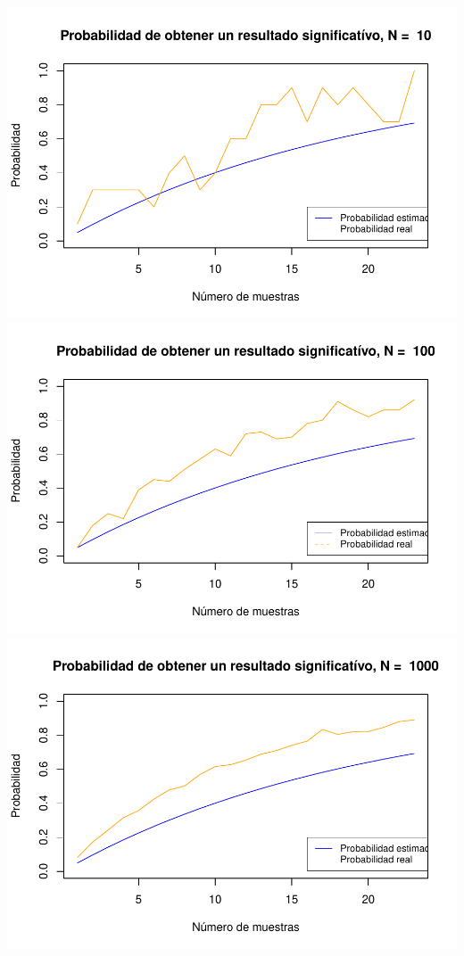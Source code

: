 \documentclass[]{article}
\begin{document}
\includegraphics{Enunciado_Tarea_3_files/figure-latex/unnamed-chunk-13-1.pdf}
\includegraphics{Enunciado_Tarea_3_files/figure-latex/unnamed-chunk-13-2.pdf}
\includegraphics{Enunciado_Tarea_3_files/figure-latex/unnamed-chunk-13-3.pdf}
\end{document}
